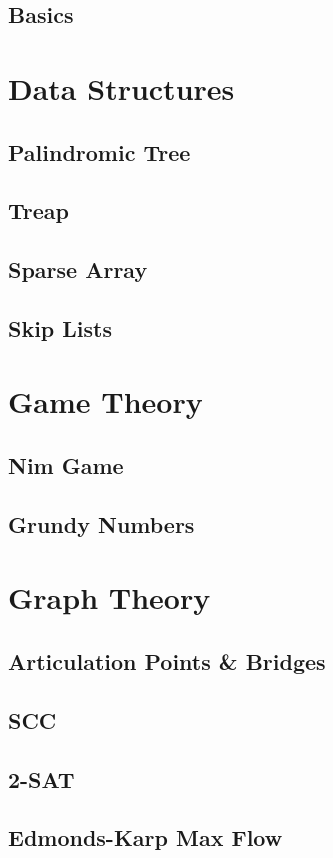 \documentclass[twocolumn]{article}
\begin{document}
		\subsection{Basics}
			
	\section{Data Structures}
		\subsection{Palindromic Tree}
		\subsection{Treap}
		\subsection{Sparse Array}
		\subsection{Skip Lists}
	\section{Game Theory}
		\subsection{Nim Game}
		\subsection{Grundy Numbers}
	\section{Graph Theory}
		\subsection{Articulation Points \& Bridges}
		\subsection{SCC}
		\subsection{2-SAT}
		\subsection{Edmonds-Karp Max Flow}
\end{document}
